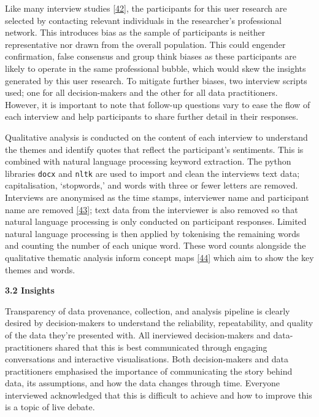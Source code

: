 \documentclass{article}
\begin{document}
Like many interview studies \protect\hyperlink{ref-futzing}{{[}42{]}},
the participants for this user research are selected by contacting
relevant individuals in the researcher's professional network. This
introduces bias as the sample of participants is neither representative
nor drawn from the overall population. This could engender confirmation,
false consensus and group think biases as these participants are likely
to operate in the same professional bubble, which would skew the
insights generated by this user research. To mitigate further biases,
two interview scripts used; one for all decision-makers and the other
for all data practitioners. However, it is important to note that
follow-up questions vary to ease the flow of each interview and help
participants to share further detail in their responses.

Qualitative analysis is conducted on the content of each interview to
understand the themes and identify quotes that reflect the participant's
sentiments. This is combined with natural language processing keyword
extraction. The python libraries \texttt{docx} and \texttt{nltk} are
used to import and clean the interviews text data; capitalisation,
`stopwords,' and words with three or fewer letters are removed.
Interviews are anonymised as the time stamps, interviewer name and
participant name are removed \protect\hyperlink{ref-jono}{{[}43{]}};
text data from the interviewer is also removed so that natural language
processing is only conducted on participant responses. Limited natural
language processing is then applied by tokenising the remaining words
and counting the number of each unique word. These word counts alongside
the qualitative thematic analysis inform concept maps
\protect\hyperlink{ref-GPT}{{[}44{]}} which aim to show the key themes
and words.

\textbf{3.2 Insights}

Transparency of data provenance, collection, and analysis pipeline is
clearly desired by decision-makers to understand the reliability,
repeatability, and quality of the data they're presented with. All
inerviewed decision-makers and data-practitioners shared that this is
best communicated through engaging conversations and interactive
visualisations. Both decision-makers and data practitioners emphasised
the importance of communicating the story behind data, its assumptions,
and how the data changes through time. Everyone interviewed acknowledged
that this is difficult to achieve and how to improve this is a topic of
live debate.
\end{document}
